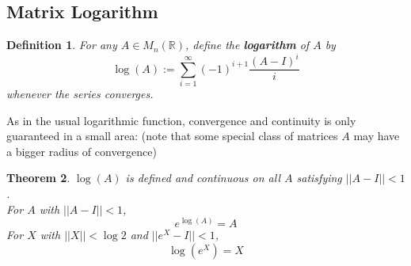 \documentclass[11pt]{article}
\newtheorem{theorem}{Theorem}[section]
\newtheorem{definition}[theorem]{Definition}
\newcommand{\bb}[1]{\mathbb{#1}}
\begin{document}
\subsection{Matrix Logarithm}
\begin{definition}
For any $A \in M_{n}(\bb{R})$, define the \textbf{logarithm} of $A$ by
$$\log(A) := \sum_{i = 1}^{\infty} (-1)^{i+1} \frac{(A-I)^i}{i}$$
whenever the series converges.
\end{definition}
As in the usual logarithmic function, convergence and continuity is only guaranteed in a small area: (note that some special class of matrices $A$ may have a bigger radius of convergence)
\begin{theorem}
$\log (A)$ is defined and continuous on all $A$ satisfying $||A - I|| < 1$.\\
For $A$ with $||A-I||< 1$,
$$e^{\log(A)} = A$$
For $X$ with $||X||< \log 2$ and $||e^X - I||<1$,
$$\log (e^X) = X$$
\end{theorem}
\end{document}

